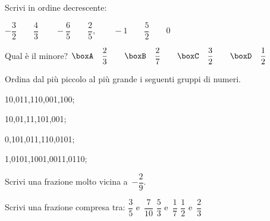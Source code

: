 \begin{esercizio}
 \label{ese:3.33}
Scrivi in ordine decrescente:

\vspace{.3em}
\(-\dfrac{3}{2} \qquad \dfrac{4}{3} \qquad -\dfrac{6}{5} \qquad \dfrac{2}{5},
\qquad-1 \qquad \dfrac{5}{2} \qquad 0\)
\end{esercizio}

 \begin{esercizio}
\label{ese:3.34}
Qual è il minore? \qquad
\(\boxA\quad\dfrac{2}{3}\qquad
\boxB\quad\dfrac{2}{7}\qquad
\boxC\quad\dfrac{3}{2}\qquad
\boxD\quad\dfrac{1}{2}\)
\end{esercizio}

\begin{esercizio}
 \label{ese:3.36}
Ordina dal più piccolo al più grande i seguenti gruppi di numeri.
\begin{multicols}{2}
\begin{enumeratea}
\item 10,011,110,001,100;
\item 10,01,11,101,001;
\item 0,101,011,110,0101;
\item 1,0101,1001,0011,0110;
\end{enumeratea}
\end{multicols}
\end{esercizio}

\begin{esercizio}
\label{ese:3.37}
Scrivi una frazione molto vicina a~\(-\dfrac{2}{9}.\)
\end{esercizio}

\begin{esercizio}
\label{ese:3.38}
Scrivi una frazione compresa tra:\qquad \qquad
\(\dfrac{3}{5}\) e~\(\dfrac{7}{10}\) \qquad 
\(\dfrac{5}{3}\) e~\(\dfrac{1}{7}\) \qquad 
\(\dfrac{1}{2}\) e~\(\dfrac{2}{3}\)
\end{esercizio}

